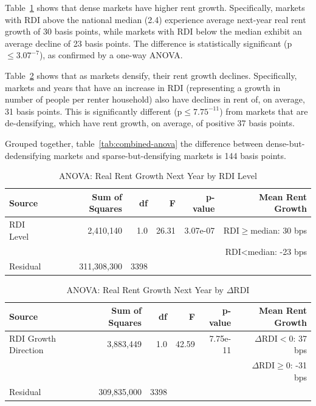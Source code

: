 \documentclass[APA,Times1COL]{WileyNJDv5} %
\begin{document}
Table~\ref{tab:anova-results-rdi} shows that dense markets have higher rent growth. Specifically, markets with RDI above the national median (2.4) experience average next-year real rent growth of 30 basis points, while markets with RDI below the median exhibit an average decline of 23 basis points. The difference is statistically significant  (p$\leq 3.07^{-7}$), as confirmed by a one-way ANOVA. 

Table~\ref{tab:anova-results-deltardi} shows that as markets densify, their rent growth declines. Specifically, markets and years that have an increase in RDI (representing a growth in number of people per renter household) also have declines in rent of, on average, 31 basis points. This is significantly different (p$\leq 7.75^{-11}$) from markets that are de-densifying, which have rent growth, on average, of positive 37 basis points. 

Grouped together, table~\ref{tab:combined-anova} the difference between dense-but-dedensifying markets and sparse-but-densifying markets is 144 basis points.

\begin{table}[h]
	\centering
	\caption{ANOVA: Real Rent Growth Next Year by RDI Level}
	\label{tab:anova-results-rdi}
\begin{tabular}{lrrrrr}
	\toprule
	Source         & Sum of Squares & df    & F        & p-value     & Mean Rent Growth \\
	\midrule
	RDI Level      & 2,410,140      & 1.0   & 26.31    & 3.07e-07    & RDI\(\geq\)median: 30 bps \\
	&                &       &          &             & RDI<median: -23 bps \\
	Residual       & 311,308,300    & 3398  &          &             &  \\
	\bottomrule
\end{tabular}
\end{table}


\begin{table}[h]
	\centering
	\caption{ANOVA: Real Rent Growth Next Year by \(\Delta\text{RDI}\)}
	\label{tab:anova-results-deltardi}
\begin{tabular}{lrrrrr}
	\toprule
	Source         & Sum of Squares & df    & F        & p-value     & Mean Rent Growth \\
	\midrule
	RDI Growth Direction & 3,883,449  & 1.0   & 42.59    & 7.75e-11    & \(\Delta \text{RDI} < 0\): 37 bps \\
	&            &       &          &                &\(\Delta \text{RDI} \geq 0\): -31 bps \\
	Residual             & 309,835,000 & 3398 &          &             & \\
	\bottomrule
\end{tabular}
\end{table}
\end{document}
